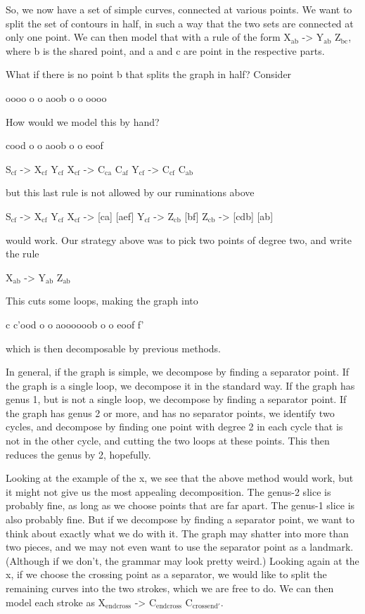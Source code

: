 \documentclass{book}
\begin{document}
So, we now have a set of simple curves, connected at various
points. We want to split the set of contours in half, in such a way
that the two sets are connected at only one point. We can then model
that with a rule of the form X$_{\mathrm{ab}}$ -> Y$_{\mathrm{ab}}$ Z$_{\mathrm{bc}}$, where b is the shared
point, and a and c are point in the respective parts.

What if there is no point b that splits the graph in half? Consider

oooo
o  o
aoob
o  o
oooo

How would we model this by hand?

cood
o  o
aoob
o  o
eoof

S$_{\mathrm{cf}}$ -> X$_{\mathrm{cf}}$ Y$_{\mathrm{cf}}$
X$_{\mathrm{cf}}$ -> C$_{\mathrm{ca}}$ C$_{\mathrm{af}}$
Y$_{\mathrm{cf}}$ -> C$_{\mathrm{cf}}$ C$_{\mathrm{ab}}$

but this last rule is not allowed by our ruminations above

S$_{\mathrm{cf}}$ -> X$_{\mathrm{cf}}$ Y$_{\mathrm{cf}}$
X$_{\mathrm{cf}}$ -> [ca] [aef]
Y$_{\mathrm{cf}}$ -> Z$_{\mathrm{cb}}$ [bf]
Z$_{\mathrm{cb}}$ -> [cdb] [ab]

would work. Our strategy above was to pick two points of degree two,
and write the rule

X$_{\mathrm{ab}}$ -> Y$_{\mathrm{ab}}$ Z$_{\mathrm{ab}}$

This cuts some loops, making the graph into

c  c'ood
o      o
aoooooob
o      o
eoof   f'

which is then decomposable by previous methods.

In general, if the graph is simple, we decompose by finding a
separator point. If the graph is a single loop, we decompose it in the
standard way. If the graph has genus 1, but is not a single loop, we
decompose by finding a separator point. If the graph has genus 2 or
more, and has no separator points, we identify two cycles, and
decompose by finding one point with degree 2 in each cycle that is not
in the other cycle, and cutting the two loops at these points. This
then reduces the genus by 2, hopefully.

Looking at the example of the x, we see that the above method would
work, but it might not give us the most appealing decomposition. The
genus-2 slice is probably fine, as long as we choose points that are
far apart. The genus-1 slice is also probably fine. But if we
decompose by finding a separator point, we want to think about exactly
what we do with it. The graph may shatter into more than two pieces,
and we may not even want to use the separator point as a
landmark. (Although if we don't, the grammar may look pretty weird.)
Looking again at the x, if we choose the crossing point as a
separator, we would like to split the remaining curves into the two
strokes, which we are free to do. We can then model each stroke as
X$_{\mathrm{end cross}}$ -> C$_{\mathrm{end cross}}$ C$_{\mathrm{cross end'}}$.
\end{document}
